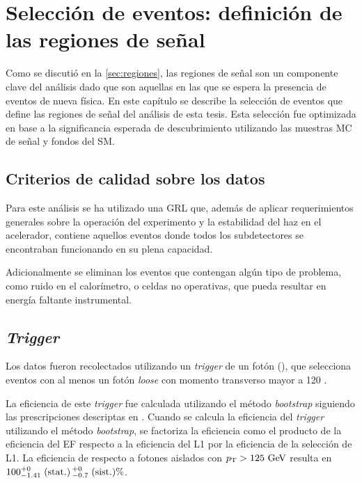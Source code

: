 \chapter{Selección de eventos: definición de las regiones de señal}
\label{cap:seleccion}

Como se discutió en la \cref{sec:regiones}, las regiones de señal son un
componente clave del análisis dado que son aquellas en las que se espera la
presencia de eventos de nueva física. En este capítulo se describe la selección
de eventos que define las regiones de señal del análisis de esta tesis. Esta
selección fue optimizada en base a la significancia esperada de descubrimiento
utilizando las muestras MC de señal y fondos del SM.


\section{Criterios de calidad sobre los datos}


Para este análisis se ha utilizado una GRL que, además de aplicar requerimientos
generales sobre la operación del experimento y la estabilidad del haz en el
acelerador, contiene aquellos eventos donde todos los subdetectores se
encontraban funcionando en su plena capacidad.

Adicionalmente se eliminan los eventos que contengan algún tipo de problema,
como ruido en el calorímetro, o celdas no operativas, que pueda resultar en
energía faltante instrumental.


\section{\emph{Trigger}}\label{sec:trigger}

Los datos fueron recolectados utilizando un \emph{trigger} de un fotón (\trigchain), que
selecciona eventos con al menos un fotón \emph{loose} con momento transverso mayor a
120 \gev.

La eficiencia de este \emph{trigger} fue calculada utilizando el método \emph{bootstrap}
siguiendo las prescripciones descriptas en \cite{ATLAS-CONF-2011-114,Damazio:1609629}.
Cuando se calcula la eficiencia del \emph{trigger} utilizando el método \emph{bootstrap}, se factoriza
la eficiencia como el producto de la eficiencia del EF respecto a la eficiencia del L1
por la eficiencia de la selección de L1.
La eficiencia de {\trigchain} respecto a fotones aislados con $\pt>125\gev$ resulta en
$100^{+0}_{-1.41}\mbox{$\;$(stat.)} \, {}^{+0}_{-0.7}\mbox{$\;$(sist.)} \%$.

